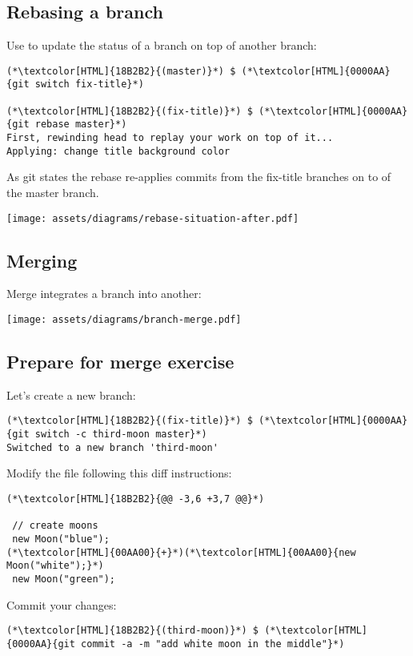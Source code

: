 \subsection{Rebasing a branch}
\begin{frame}[fragile]
  \subslidetitle

  Use  to update the status of a branch on top of another branch:

  \begin{lstlisting}
(*\textcolor[HTML]{18B2B2}{(master)}*) $ (*\textcolor[HTML]{0000AA}{git switch fix-title}*)

(*\textcolor[HTML]{18B2B2}{(fix-title)}*) $ (*\textcolor[HTML]{0000AA}{git rebase master}*)
First, rewinding head to replay your work on top of it...
Applying: change title background color
\end{lstlisting}

  As git states the rebase re-applies commits from the fix-title branches on to of the master branch.

  \vspace{1em}
  \centerline{\texttt{[image: assets/diagrams/rebase-situation-after.pdf]}}

\end{frame}

\subsection{Merging}
\begin{frame}[fragile]
  \subslidetitle
  Merge integrates a branch into another:
  \centerline{\texttt{[image: assets/diagrams/branch-merge.pdf]}}
\end{frame}

\subsection{Prepare for merge exercise}
\begin{frame}[fragile]
  \subslidetitle

  Let's create a new  branch:
  \begin{lstlisting}
(*\textcolor[HTML]{18B2B2}{(fix-title)}*) $ (*\textcolor[HTML]{0000AA}{git switch -c third-moon master}*)
Switched to a new branch 'third-moon'
\end{lstlisting}

  Modify the  file following this diff instructions:
  \begin{lstlisting}
(*\textcolor[HTML]{18B2B2}{@@ -3,6 +3,7 @@}*)

 // create moons
 new Moon("blue");
(*\textcolor[HTML]{00AA00}{+}*)(*\textcolor[HTML]{00AA00}{new Moon("white");}*)
 new Moon("green");
\end{lstlisting}
  Commit your changes:
  \begin{lstlisting}
(*\textcolor[HTML]{18B2B2}{(third-moon)}*) $ (*\textcolor[HTML]{0000AA}{git commit -a -m "add white moon in the middle"}*)
\end{lstlisting}
\end{frame}

